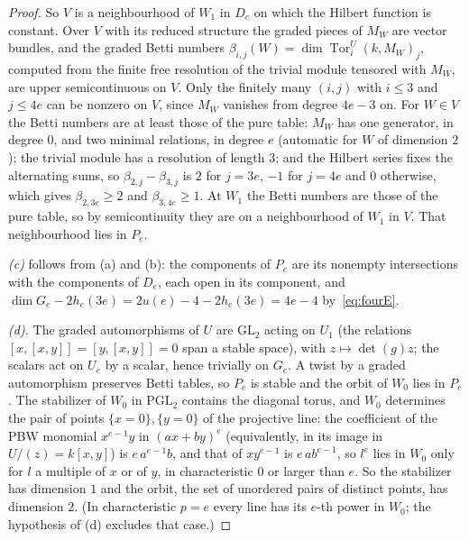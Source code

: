 \documentclass[11pt]{article}
\theoremstyle{definition}
\theoremstyle{remark}
\newcommand{\Tor}{\operatorname{Tor}}
\begin{document}
\begin{proof}
So $V$ is a neighbourhood of $W_1$ in $D_e$ on which the Hilbert function is constant. Over $V$ with its reduced structure the graded pieces of $M_W$ are vector bundles, and the graded Betti numbers $\beta_{i,j}(W)=\dim\Tor_i^U(k,M_W)_j$, computed from the finite free resolution of the trivial module tensored with $M_W$, are upper semicontinuous on $V$. Only the finitely many $(i,j)$ with $i\le3$ and $j\le4e$ can be nonzero on $V$, since $M_W$ vanishes from degree $4e-3$ on. For $W\in V$ the Betti numbers are at least those of the pure table: $M_W$ has one generator, in degree $0$, and two minimal relations, in degree $e$ (automatic for $W$ of dimension $2$); the trivial module has a resolution of length $3$; and the Hilbert series fixes the alternating sums, so $\beta_{2,j}-\beta_{3,j}$ is $2$ for $j=3e$, $-1$ for $j=4e$ and $0$ otherwise, which gives $\beta_{2,3e}\ge2$ and $\beta_{3,4e}\ge1$. At $W_1$ the Betti numbers are those of the pure table, so by semicontinuity they are on a neighbourhood of $W_1$ in $V$. That neighbourhood lies in $P_e$.

\emph{(c)} follows from (a) and (b): the components of $P_e$ are its nonempty intersections with the components of $D_e$, each open in its component, and $\dim G_e-2h_e(3e)=2u(e)-4-2h_e(3e)=4e-4$ by~\eqref{eq:fourE}.

\emph{(d).} The graded automorphisms of $U$ are $\mathrm{GL}_2$ acting on $U_1$ (the relations $[x,[x,y]]=[y,[x,y]]=0$ span a stable space), with $z\mapsto\det(g)z$; the scalars act on $U_e$ by a scalar, hence trivially on $G_e$. A twist by a graded automorphism preserves Betti tables, so $P_e$ is stable and the orbit of $W_0$ lies in $P_e$. The stabilizer of $W_0$ in $\mathrm{PGL}_2$ contains the diagonal torus, and $W_0$ determines the pair of points $\{x=0\},\{y=0\}$ of the projective line: the coefficient of the PBW monomial $x^{e-1}y$ in $(ax+by)^e$ (equivalently, in its image in $U/(z)=k[x,y]$) is $e\,a^{e-1}b$, and that of $xy^{e-1}$ is $e\,ab^{e-1}$, so $l^e$ lies in $W_0$ only for $l$ a multiple of $x$ or of $y$, in characteristic $0$ or larger than $e$. So the stabilizer has dimension $1$ and the orbit, the set of unordered pairs of distinct points, has dimension $2$. (In characteristic $p=e$ every line has its $e$-th power in $W_0$; the hypothesis of (d) excludes that case.)
\end{proof}
\end{document}
